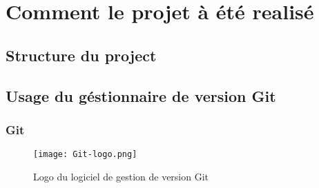 \appendix
\chapter{Comment le projet à été realisé}
\section{Structure du project}
\section{Usage du géstionnaire de version Git}
\subsection{Git}

\begin{figure}
\centering
\texttt{[image: Git-logo.png]}
\caption{Logo du logiciel de gestion de version Git}
\end{figure}